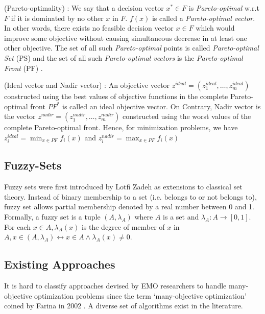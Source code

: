 \documentclass[journal]{IEEEtran}
\begin{document}
\begin{definition} (Pareto-optimality) :
We say that a decision vector $x^*\in F$ is \textit{Pareto-optimal} w.r.t $F$ if it is dominated by no other $x$ in $F$. $f(x)$ is called a \textit{Pareto-optimal vector}. In other words, there exists no feasible decision vector $x\in F$ which would improve some objective without causing simultaneous decrease in at least one other objective. The set of all such \textit{Pareto-optimal} points is called \textit{Pareto-optimal Set} (PS) and the set of all such \textit{Pareto-optimal vectors} is the \textit{Pareto-optimal Front} (PF) \cite{miettinen1999nonlinear}.
\end{definition}

\begin{definition} (Ideal vector and Nadir vector) :
An objective vector $z^{ideal} = (z^{ideal}_1, \dots, z^{ideal}_m)$ constructed using the best values of objective functions in the complete Pareto-optimal front $PF^{*}$ is called an ideal objective vector. 
On Contrary, Nadir vector is the vector $z^{nadir} = (z^{nadir}_1,\dots,z^{nadir}_m)$ constructed using the worst values of the complete Pareto-optimal front. Hence, for minimization problems, we have $z^{ideal}_i = \min_{x \in PF} f_i(x)$ and  $z^{nadir}_i = \max_{x \in PF} f_i(x)$
\end{definition}

\subsection{Fuzzy-Sets}

Fuzzy sets were first introduced by Lotfi Zadeh \cite{zadeh1965fuzzy} as extensions to classical set theory. Instead of binary membership to a set (i.e. belongs to or not belongs to), fuzzy set allows partial membership denoted by a real number between 0 and 1.
Formally, a fuzzy set is a tuple $(A,\lambda_A)$ where $A$ is a set and $\lambda_A: A \rightarrow [0, 1]$. For each $x\in A, \lambda_A(x)$ is the degree of member of $x$ in $A,x \in (A, \lambda_A) \leftrightarrow x \in A \wedge \lambda_A(x)\neq 0$.


\subsection{Existing Approaches}
It is hard to classify approaches devised by EMO researchers to handle many-objective optimization problems since the term `many-objective optimization' coined by Farina in 2002 \cite{farina2002optimal}. A diverse set of algorithms exist in the literature.\\
\end{document}
